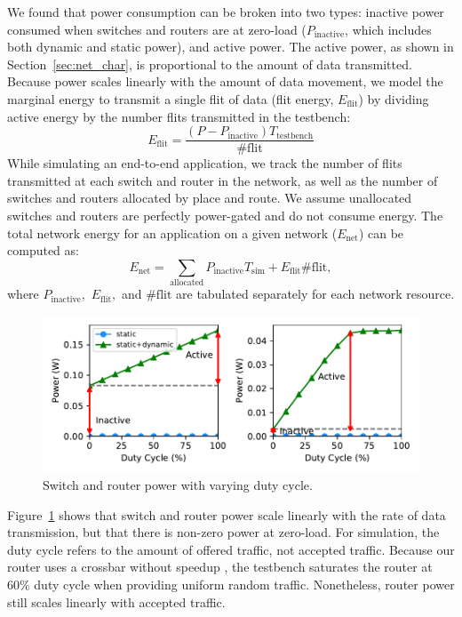 We found that power consumption can be broken into two types: 
inactive power consumed when switches and routers are at zero-load ($P_{\text{inactive}}$, which includes both dynamic and static power),
and active power. The active power, as shown in Section~\ref{sec:net_char}, is proportional to the amount of
data transmitted. 
Because power scales linearly with the amount of data movement, we model the marginal energy to transmit a single flit of data (flit energy, $E_{\text{flit}}$) by dividing active energy by the number flits transmitted in the testbench:
\begin{equation}
  E_{\text{flit}} = \frac{\left(P-P_{\text{inactive}}\right) T_{\text{testbench}}}{\#\text{flit}} 
\end{equation}
While simulating an end-to-end application, we track the number of flits transmitted at each switch and router in the network, as well as the number of switches and routers allocated by place and route. 
We assume unallocated switches and routers are perfectly power-gated and do not consume energy.
The total network energy for an application on a given network ($E_{\text{net}}$) can be computed as:
\begin{equation}
  E_{\text{net}} = \sum_{\text{allocated}} P_{\text{inactive}} T_{\text{sim}}
  + E_{\text{flit}}  \#\text{flit},
\end{equation}
where $P_{\text{inactive}},$ $E_{\text{flit}},$ and $\#\text{flit}$ are tabulated separately for each network resource.

\begin{figure}
\centering
\includegraphics[width=0.8\columnwidth]{network/figs/sweep.pdf}
  \caption[Switch and router power with varying duty cycle]{Switch and router power with varying duty cycle.}\label{fig:sweep}
\end{figure}


Figure~\ref{fig:sweep} shows that switch and router power scale linearly with the rate of data transmission, but that there is non-zero power at zero-load. 
For simulation, the duty cycle refers to the amount of offered traffic, not accepted traffic.
Because our router uses a crossbar without speedup \cite{dallytowles}, the testbench saturates the router at 60\% duty cycle when providing uniform random traffic. 
Nonetheless, router power still scales linearly with accepted traffic.

